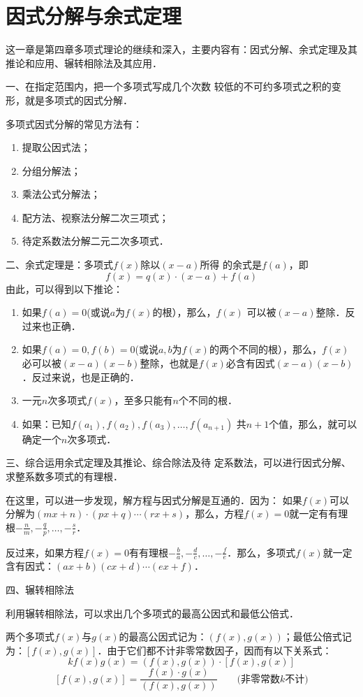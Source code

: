 \section*{因式分解与余式定理}

这一章是第四章多项式理论的继续和深入，主要内容有：因式分解、余式定理及其推论和应用、辗转相除法及其应用．

一、在指定范围内，把一个多项式写成几个次数
较低的不可约多项式之积的变形，就是多项式的因式分解．

多项式因式分解的常见方法有：
\begin{enumerate}
    \item 提取公因式法；
    \item 分组分解法；
    \item 乘法公式分解法；
    \item 配方法、视察法分解二次三项式；
    \item 待定系数法分解二元二次多项式．
\end{enumerate} 

二、余式定理是：多项式$f(x)$除以$(x-a)$所得
的余式是$f(a)$，即
\[f (x) =q (x) \cdot (x-a) +f (a) \]
由此，可以得到以下推论：
\begin{enumerate}
\item 如果$f(a)=0$(或说$a$为$f(x)$的根），那么，$f(x)$
可以被$(x-a)$整除．反过来也正确．
\item 如果$f(a)=0,f(b)=0$(或说$a,b$为$f(x)$的两个不同的根），那么，$f(x)$必可以被$(x-a)(x-b)$整除，也就是$f(x)$必含有因式$(x-a)(x-b)$．反过来说，也是正确的．
\item 一元$n$次多项式$f(x)$，至多只能有$n$个不同的根．
\item  如果：已知$f(a_1),f(a_2),f(a_3),\ldots,f(a_{n+1})$
共$n+1$个值，那么，就可以确定一个$n$次多项式．
\end{enumerate}

三、综合运用余式定理及其推论、综合除法及待
定系数法，可以进行因式分解、求整系数多项式的有理根．

在这里，可以进一步发现，解方程与因式分解是互通的．因为：
如果$f(x)$可以分解为$(mx+n)\cdot (px+q)\cdots (rx+s)$，那么，方程$f(x)=0$就一定有有理根$-\frac{n}{m},-\frac{q}{p},\ldots,-\frac{s}{r}$．

反过来，如果方程$f(x)=0$有有理根$-\frac{b}{a},-\frac{d}{c},\ldots,-\frac{f}{e}$．那么，多项式$f(x)$就一定含有因式：$(ax+b)(cx+d)\cdots(ex+f)$．

四、辗转相除法

利用辗转相除法，可以求出几个多项式的最高公因式和最低公倍式．

两个多项式$f(x)$与$g(x)$的最高公因式记为：$(f(x),g(x))$；最低公倍式记为：$[f(x), g(x)]$．由于它们都不计非零常数因子，因而有以下关系式：
\[ kf (x) g (x) = (f(x), g(x))\cdot [f(x),g(x)]\]
\[[f(x),g(x)]=\frac{f(x)\cdot g(x)}{(f(x), g(x))}\qquad \text{(非零常数$k$不计)}\]
